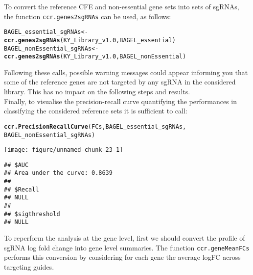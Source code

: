 \documentclass{article}\usepackage[]{graphicx}\usepackage[]{color}
\makeatletter
\def\maxwidth{ %
  \ifdim\Gin@nat@width>\linewidth
    \linewidth
  \else
    \Gin@nat@width
  \fi
}
\newcommand{\hlstd}[1]{\textcolor[rgb]{0.345,0.345,0.345}{#1}}%
\newcommand{\hlkwb}[1]{\textcolor[rgb]{0.69,0.353,0.396}{#1}}%
\newcommand{\hlkwd}[1]{\textcolor[rgb]{0.737,0.353,0.396}{\textbf{#1}}}%
\newenvironment{kframe}{%
 \def\at@end@of@kframe{}%
 \ifinner\ifhmode%
  \def\at@end@of@kframe{\end{minipage}}%
  \begin{minipage}{\columnwidth}%
 \fi\fi%
 \def\FrameCommand##1{\hskip\@totalleftmargin \hskip-\fboxsep
 \colorbox{shadecolor}{##1}\hskip-\fboxsep
     \hskip-\linewidth \hskip-\@totalleftmargin \hskip\columnwidth}%
 \MakeFramed {\advance\hsize-\width
   \@totalleftmargin\z@ \linewidth\hsize
   \@setminipage}}%
 {\par\unskip\endMakeFramed%
 \at@end@of@kframe}
\newenvironment{knitrout}{}{} %
\makeatother
\begin{document}
To convert the reference CFE and non-essential gene sets into sets of sgRNAs, the function \texttt{ccr.genes2sgRNAs} can be used, as follows:



\begin{knitrout}
\color{fgcolor}\begin{kframe}
\begin{alltt}
\hlstd{BAGEL_essential_sgRNAs}\hlkwb{<-}
    \hlkwd{ccr.genes2sgRNAs}\hlstd{(KY_Library_v1.0,BAGEL_essential)}
\hlstd{BAGEL_nonEssential_sgRNAs}\hlkwb{<-}
    \hlkwd{ccr.genes2sgRNAs}\hlstd{(KY_Library_v1.0,BAGEL_nonEssential)}
\end{alltt}
\end{kframe}
\end{knitrout}



Following these calls, possible warning messages could appear informing you that some of the reference genes are not targeted by any sgRNA in the considered library. This has no impact on the following steps and results.\\

Finally, to visualise the precision-recall curve quantifying the performances in classifying the considered reference sets it is sufficient to call: 
\begin{knitrout}
\color{fgcolor}\begin{kframe}
\begin{alltt}
\hlkwd{ccr.PrecisionRecallCurve}\hlstd{(FCs,BAGEL_essential_sgRNAs,}
                             \hlstd{BAGEL_nonEssential_sgRNAs)}
\end{alltt}
\end{kframe}
\texttt{[image: figure/unnamed-chunk-23-1]} 
\begin{kframe}\begin{verbatim}
## $AUC
## Area under the curve: 0.8639
## 
## $Recall
## NULL
## 
## $sigthreshold
## NULL
\end{verbatim}
\end{kframe}
\end{knitrout}

To reperform the analysis at the gene level, first we should convert the profile of sgRNA log fold change into gene level summaries. The function \texttt{ccr.geneMeanFCs} performs this conversion by considering for each gene the average logFC across targeting guides.
\end{document}
